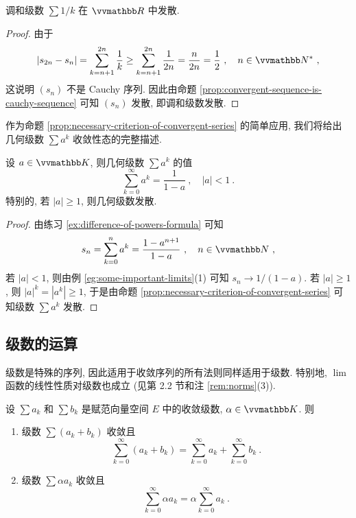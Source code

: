\begin{example}\label{eg:harmonic-series}
    调和级数 \(\sum 1 / k\) 在 \(\R\) 中发散.
\end{example}

\begin{proof}
    由于
    \[
        |s_{2 n} - s_n| = \sum_{k = n + 1}^{2 n} \frac{1}{k} \geq \sum_{k = n + 1}^{2 n} \frac{1}{2 n} = \frac{n}{2 n} = \frac{1}{2}\ ,\quad n \in \N^\ast\ ,
    \]
    这说明 \((s_n)\) 不是 Cauchy 序列. 因此由命题 \ref{prop:convergent-sequence-is-cauchy-sequence} 可知 \((s_n)\) 发散, 即调和级数发散.
\end{proof}

作为命题 \ref{prop:necessary-criterion-of-convergent-series} 的简单应用, 我们将给出几何级数 \(\sum a^k\) 收敛性态的完整描述.

\begin{example}\label{eg:geometric-series}
    设 \(a \in \K\), 则几何级数 \(\sum a^k\) 的值
    \[
        \sum_{k = 0}^\infty a^k = \frac{1}{1 - a}\ ,\quad |a| < 1\ .
    \]
    特别的, 若 \(|a| \geq 1\), 则几何级数发散.
\end{example}

\begin{proof}
    由练习 \ref{ex:difference-of-powers-formula} 可知
    \[
        s_n = \sum_{k = 0}^n a^k = \frac{1 - a^{n + 1}}{1 - a}\ ,\quad n \in \N\ ,
    \]
    若 \(|a| < 1\), 则由例 \ref{eg:some-important-limits}(1) 可知 \(s_n \to 1 / (1 - a)\). 若 \(|a| \geq 1\), 则 \(|a|^k = |a^k| \geq 1\), 于是由命题 \ref{prop:necessary-criterion-of-convergent-series} 可知级数 \(\sum a^k\) 发散.
\end{proof}

\subsection{级数的运算}

级数是特殊的序列, 因此适用于收敛序列的所有法则同样适用于级数. 特别地, \(\lim\) 函数的线性性质对级数也成立 (见第 2.2 节和注 \ref{rem:norms}(3)).

\begin{proposition}\label{prop:calculating-with-series}
    设 \(\sum a_k\) 和 \(\sum b_k\) 是赋范向量空间 \(E\) 中的收敛级数, \(\alpha \in \K\). 则
    \begin{enumerate}
        \item 级数 \(\sum (a_k + b_k)\) 收敛且
        \[
            \sum_{k = 0}^\infty (a_k + b_k) = \sum_{k = 0}^\infty a_k + \sum_{k = 0}^\infty b_k\ .
        \]
        \item 级数 \(\sum \alpha a_k\) 收敛且
        \[
            \sum_{k = 0}^\infty \alpha a_k = \alpha \sum_{k = 0}^\infty a_k\ .
        \]
    \end{enumerate}
\end{proposition}

